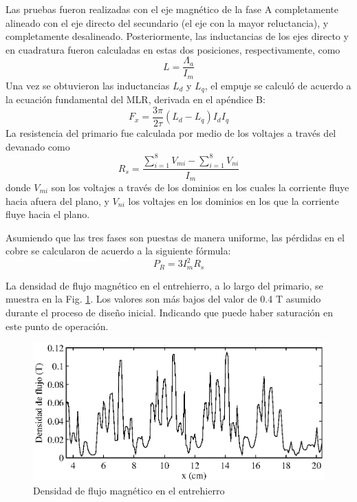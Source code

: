 Las pruebas fueron realizadas con el eje magnético de la fase A completamente alineado con el eje directo del secundario (el eje con la mayor reluctancia), y completamente desalineado. Posteriormente, las inductancias de los ejes directo y en cuadratura fueron calculadas en estas dos posiciones, respectivamente, como
\begin{equation}
L = \frac{\Lambda_a}{I_m}
\end{equation}
Una vez se obtuvieron las inductancias $L_d$ y $L_q$, el empuje se calculó de acuerdo a la  ecuación fundamental del MLR, derivada en el apéndice B:
\begin{equation}
F_x = \frac{3\pi}{2\tau}(L_d - L_q)I_d I_q
\label{developedThrust}
\end{equation}
La resistencia del primario fue calculada por medio de los voltajes a través del devanado como
\begin{equation}
R_s = \frac{\sum_{i=1}^8 V_{mi} - \sum_{i=1}^8 V_{ni}}{I_m}
\end{equation}
donde $V_{mi}$ son los voltajes a través de los dominios en los cuales la corriente fluye hacia afuera del plano, y $V_{ni}$ los voltajes en los dominios en los que la corriente fluye hacia el plano.

Asumiendo que las tres fases son puestas de manera uniforme, las pérdidas en el cobre se calcularon de acuerdo a la siguiente fórmula:
\begin{equation}
P_{R} = 3I_m^2 R_s
\end{equation}

La densidad de flujo magnético en el entrehierro, a lo largo del primario, se muestra en la Fig. \ref{fig:airgapmfd}. Los valores son más bajos del valor de 0.4 T asumido durante el proceso de diseño inicial. Indicando que puede haber saturación en este punto de operación.

\begin{figure}[t]
\centering
\includegraphics[scale=1]{../img/Desarrollo_de_un_diseno_inicial/airgapmfd.eps}
\caption{Densidad de flujo magnético en el entrehierro}
\label{fig:airgapmfd}
\end{figure}

